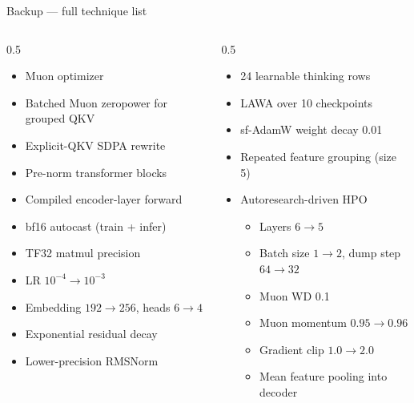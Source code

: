 \documentclass[aspectratio=169,10pt]{beamer}
\begin{document}
\begin{frame}{Backup --- full technique list}
  \tiny
  \begin{columns}[T]
    \begin{column}{0.5\textwidth}
      \begin{itemize}
        \item Muon optimizer
        \item Batched Muon zeropower for grouped QKV
        \item Explicit-QKV SDPA rewrite
        \item Pre-norm transformer blocks
        \item Compiled encoder-layer forward
        \item bf16 autocast (train + infer)
        \item TF32 matmul precision
        \item LR $10^{-4}\to10^{-3}$
        \item Embedding $192\to256$, heads $6\to4$
        \item Exponential residual decay
        \item Lower-precision RMSNorm
      \end{itemize}
    \end{column}
    \begin{column}{0.5\textwidth}
      \begin{itemize}
        \item 24 learnable thinking rows
        \item LAWA over 10 checkpoints
        \item sf-AdamW weight decay 0.01
        \item Repeated feature grouping (size 5)
        \item Autoresearch-driven HPO
        \begin{itemize}\tiny
          \item Layers $6\to5$
          \item Batch size $1\to2$, dump step $64\to32$
          \item Muon WD 0.1
          \item Muon momentum $0.95\to0.96$
          \item Gradient clip $1.0\to2.0$
          \item Mean feature pooling into decoder
        \end{itemize}
      \end{itemize}
    \end{column}
  \end{columns}
\end{frame}
\end{document}
